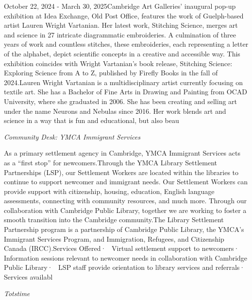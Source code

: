 \documentclass[letterpaper, 10pt]{article}
\newcommand{\subtitle}[1]{\textit{\large #1}\vspace{0.5em}}
\newcommand{\articlecontent}[1]{\small #1\vspace{1em}}
\begin{document}
\begin{multicols}{2}
{October 22, 2024 - March 30, 2025Cambridge Art Galleries' inaugural pop-up exhibition at Idea Exchange, Old Post Office, features the work of Guelph-based artist Lauren Wright Vartanian. Her latest work, Stitching Science, merges art and science in 27 intricate diagrammatic embroideries. A culmination of three years of work and countless stitches, these embroideries, each representing a letter of the alphabet, depict scientific concepts in a creative and accessible way. This exhibition coincides with Wright Vartanian’s book release, Stitching Science: Exploring Science from A to Z, published by Firefly Books in the fall of 2024.Lauren Wright Vartanian is a multidisciplinary artist currently focusing on textile art. She has a Bachelor of Fine Arts in Drawing and Painting from OCAD University, where she graduated in 2006. She has been creating and selling art under the name Neurons and Nebulas since 2016. Her work blends art and science in a way that is fun and educational, but also beau
}
\vspace{10px}

\subtitle{Community Desk: YMCA Immigrant Services}

\articlecontent{

\qrcode[height=1.5cm]{https://ideaexchange.libnet.info/event/12507857}
\vspace{10px}

As a primary settlement agency in Cambridge, YMCA Immigrant Services acts as a “first stop” for newcomers.Through the YMCA Library Settlement Partnerships (LSP), our Settlement Workers are located within the libraries to continue to support newcomer and immigrant needs. Our Settlement Workers can provide support with citizenship, housing, education, English language assessments, connecting with community resources, and much more. Through our collaboration with Cambridge Public Library, together we are working to foster a smooth transition into the Cambridge community.The Library Settlement Partnership program is a partnership of Cambridge Public Library, the YMCA’s Immigrant Services Program, and Immigration, Refugees, and Citizenship Canada (IRCC).Services Offered·  Virtual settlement support to newcomers·  Information sessions relevant to newcomer needs in collaboration with Cambridge Public Library·  LSP staff provide orientation to library services and referrals·  Services availabl
}
\vspace{10px}

\subtitle{Totstime}

\articlecontent{

}
\end{multicols}
\end{document}
